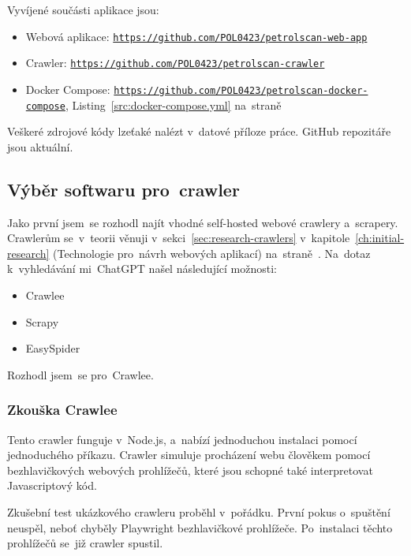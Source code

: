 Vyvíjené součásti aplikace jsou:

\begin{itemize}
    \item Webová aplikace:
        \texttt{\url{https://github.com/POL0423/petrolscan-web-app}}
    \item Crawler:
        \texttt{\url{https://github.com/POL0423/petrolscan-crawler}}
    \item Docker Compose:
        \texttt{\url{https://github.com/POL0423/petrolscan-docker-compose}},
        Listing~\ref{src:docker-compose.yml}
        na~straně~\pageref{src:docker-compose.yml}
\end{itemize}

Veškeré zdrojové kódy lzeťaké nalézt v~datové příloze práce. GitHub
repozitáře jsou aktuální.

\subsection{Výběr softwaru pro~crawler}
\label{sec:crawler-solutions}

Jako první jsem~se rozhodl najít vhodné self-hosted webové crawlery
a~scrapery. Crawlerům se~v~teorii věnuji v~sekci~\ref{sec:research-crawlers}
v~kapitole~\ref{ch:initial-research} (Technologie pro~návrh webových aplikací)
na~straně~\pageref{sec:research-crawlers}. Na~dotaz k~vyhledávání
mi~ChatGPT \cite{givNscvAOqB1nMpq} %
našel následující možnosti:

\begin{itemize}
    \item Crawlee
    \item Scrapy
    \item EasySpider
\end{itemize}

Rozhodl jsem~se pro~Crawlee.

\subsubsection{Zkouška Crawlee}
\label{sec:crawlee-trial}

Tento crawler funguje v~Node.js, a~nabízí jednoduchou instalaci pomocí
jednoduchého příkazu. Crawler simuluje procházení webu člověkem pomocí
bezhlavičkových webových prohlížečů, které jsou schopné také interpretovat
Javascriptový kód.

Zkušební test ukázkového crawleru proběhl v~pořádku.
První pokus o~spuštění neuspěl, neboť chyběly Playwright bezhlavičkové
prohlížeče. Po~instalaci těchto prohlížečů se~již crawler spustil.

